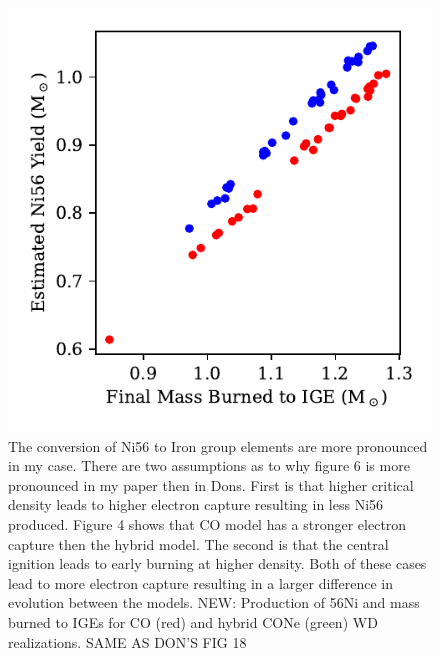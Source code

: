 \documentclass[iop,apj]{emulateapj}
\begin{document}
\begin{figure}
\includegraphics[width=\columnwidth]{figures/FMBTI_v_Ni56Yield_plot.pdf}
\caption{\label{fig:conversion}
The conversion of Ni56 to Iron group elements are more pronounced in my case. There are two assumptions as to why figure 6 is more pronounced in my paper then in Dons. 
First is that higher critical density leads to higher electron capture resulting in less Ni56 produced. Figure 4 shows that CO model has a stronger electron capture then the hybrid model. The second is that the central ignition leads to early burning at higher density. Both of these cases lead to more electron capture resulting in a larger difference in evolution between the models.
NEW: Production of 56Ni and mass burned to IGEs for CO (red) and
hybrid CONe (green) WD realizations. SAME AS DON'S FIG 18
}
\end{figure}
\end{document}
